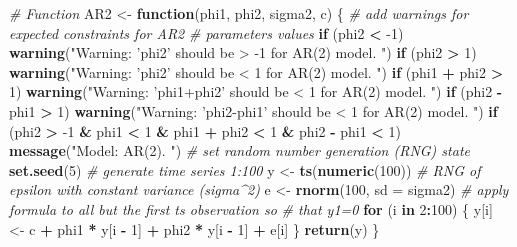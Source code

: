 \documentclass[openany]{book}
\newenvironment{Shaded}{\begin{snugshade}}{\end{snugshade}}
\newcommand{\CommentTok}[1]{\textcolor[rgb]{0.56,0.35,0.01}{\textit{#1}}}
\newcommand{\ControlFlowTok}[1]{\textcolor[rgb]{0.13,0.29,0.53}{\textbf{#1}}}
\newcommand{\DataTypeTok}[1]{\textcolor[rgb]{0.13,0.29,0.53}{#1}}
\newcommand{\DecValTok}[1]{\textcolor[rgb]{0.00,0.00,0.81}{#1}}
\newcommand{\KeywordTok}[1]{\textcolor[rgb]{0.13,0.29,0.53}{\textbf{#1}}}
\newcommand{\NormalTok}[1]{#1}
\newcommand{\OperatorTok}[1]{\textcolor[rgb]{0.81,0.36,0.00}{\textbf{#1}}}
\newcommand{\StringTok}[1]{\textcolor[rgb]{0.31,0.60,0.02}{#1}}
\begin{document}
\begin{Shaded}
\begin{Highlighting}[]
\CommentTok{# Function}
\NormalTok{AR2 <-}\StringTok{ }\ControlFlowTok{function}\NormalTok{(phi1, phi2, sigma2, c) \{}
  \CommentTok{# add warnings for expected constraints for AR2}
  \CommentTok{# parameters values}
  \ControlFlowTok{if}\NormalTok{ (phi2 }\OperatorTok{<}\StringTok{ }\DecValTok{-1}\NormalTok{) }
    \KeywordTok{warning}\NormalTok{(}\StringTok{"Warning: 'phi2' should be > -1 for AR(2) model. "}\NormalTok{)}
  \ControlFlowTok{if}\NormalTok{ (phi2 }\OperatorTok{>}\StringTok{ }\DecValTok{1}\NormalTok{) }
    \KeywordTok{warning}\NormalTok{(}\StringTok{"Warning: 'phi2' should be < 1 for AR(2) model. "}\NormalTok{)}
  \ControlFlowTok{if}\NormalTok{ (phi1 }\OperatorTok{+}\StringTok{ }\NormalTok{phi2 }\OperatorTok{>}\StringTok{ }\DecValTok{1}\NormalTok{) }
    \KeywordTok{warning}\NormalTok{(}\StringTok{"Warning: 'phi1+phi2' should be < 1 for AR(2) model. "}\NormalTok{)}
  \ControlFlowTok{if}\NormalTok{ (phi2 }\OperatorTok{-}\StringTok{ }\NormalTok{phi1 }\OperatorTok{>}\StringTok{ }\DecValTok{1}\NormalTok{) }
    \KeywordTok{warning}\NormalTok{(}\StringTok{"Warning: 'phi2-phi1' should be < 1 for AR(2) model. "}\NormalTok{)}
  \ControlFlowTok{if}\NormalTok{ (phi2 }\OperatorTok{>}\StringTok{ }\DecValTok{-1} \OperatorTok{&}\StringTok{ }\NormalTok{phi1 }\OperatorTok{<}\StringTok{ }\DecValTok{1} \OperatorTok{&}\StringTok{ }\NormalTok{phi1 }\OperatorTok{+}\StringTok{ }\NormalTok{phi2 }\OperatorTok{<}\StringTok{ }\DecValTok{1} \OperatorTok{&}\StringTok{ }\NormalTok{phi2 }\OperatorTok{-}\StringTok{ }\NormalTok{phi1 }\OperatorTok{<}\StringTok{ }
\StringTok{    }\DecValTok{1}\NormalTok{) }
    \KeywordTok{message}\NormalTok{(}\StringTok{"Model: AR(2). "}\NormalTok{)}
  \CommentTok{# set random number generation (RNG) state}
  \KeywordTok{set.seed}\NormalTok{(}\DecValTok{5}\NormalTok{)}
  \CommentTok{# generate time series 1:100}
\NormalTok{  y <-}\StringTok{ }\KeywordTok{ts}\NormalTok{(}\KeywordTok{numeric}\NormalTok{(}\DecValTok{100}\NormalTok{))}
  \CommentTok{# RNG of epsilon with constant variance (sigma^2)}
\NormalTok{  e <-}\StringTok{ }\KeywordTok{rnorm}\NormalTok{(}\DecValTok{100}\NormalTok{, }\DataTypeTok{sd =}\NormalTok{ sigma2)}
  \CommentTok{# apply formula to all but the first ts observation so}
  \CommentTok{# that y1=0}
  \ControlFlowTok{for}\NormalTok{ (i }\ControlFlowTok{in} \DecValTok{2}\OperatorTok{:}\DecValTok{100}\NormalTok{) \{}
\NormalTok{    y[i] <-}\StringTok{ }\NormalTok{c }\OperatorTok{+}\StringTok{ }\NormalTok{phi1 }\OperatorTok{*}\StringTok{ }\NormalTok{y[i }\OperatorTok{-}\StringTok{ }\DecValTok{1}\NormalTok{] }\OperatorTok{+}\StringTok{ }\NormalTok{phi2 }\OperatorTok{*}\StringTok{ }\NormalTok{y[i }\OperatorTok{-}\StringTok{ }\DecValTok{1}\NormalTok{] }\OperatorTok{+}\StringTok{ }\NormalTok{e[i]}
\NormalTok{  \}}
  \KeywordTok{return}\NormalTok{(y)}
\NormalTok{\}}


\end{Highlighting}
\end{Shaded}
\end{document}
